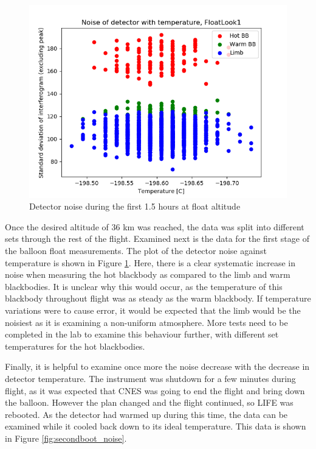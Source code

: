 \begin{figure}
\centering
  \includegraphics[width=0.8\linewidth]{mct_noise_temp_plots/FloatLook1_noisevtemp_invertedx_colours.png}
  \caption{Detector noise during the first 1.5 hours at float altitude}
  \label{fig:float_noise}
\end{figure}

Once the desired altitude of 36 km was reached, the data was split into different sets through the rest of the flight. Examined next is the data for the first stage of the balloon float measurements. The plot of the detector noise against temperature is shown in Figure \ref{fig:float_noise}. Here, there is a clear systematic increase in noise when measuring the hot blackbody as compared to the limb and warm blackbodies. It is unclear why this would occur, as the temperature of this blackbody throughout flight was as steady as the warm blackbody. If temperature variations were to cause error, it would be expected that the limb would be the noisiest as it is examining a non-uniform atmosphere. More tests need to be completed in the lab to examine this behaviour further, with different set temperatures for the hot blackbodies.

Finally, it is helpful to examine once more the noise decrease with the decrease in detector temperature. The instrument was shutdown for a few minutes during flight, as it was expected that CNES was going to end the flight and bring down the balloon. However the plan changed and the flight continued, so LIFE was rebooted. As the detector had warmed up during this time, the data can be examined while it cooled back down to its ideal temperature. This data is shown in Figure \ref{fig:secondboot_noise}.

